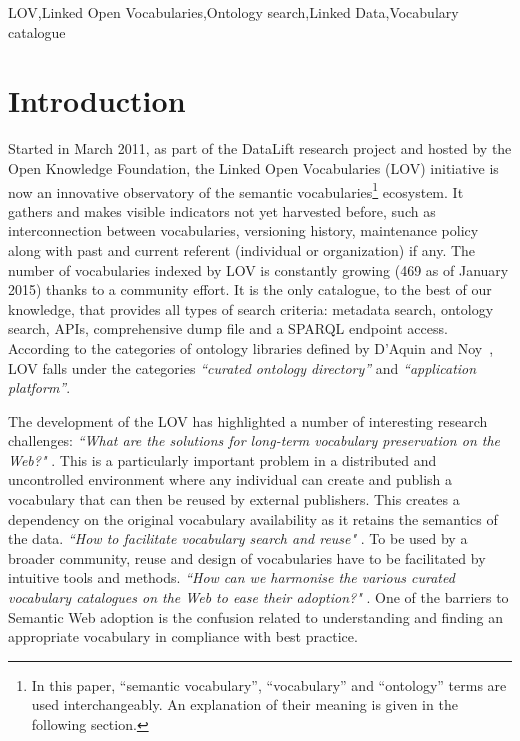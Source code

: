 \documentclass{iosart2c}
\begin{document}
\begin{frontmatter}
\begin{keyword}
LOV\sep Linked Open Vocabularies\sep Ontology search\sep Linked Data\sep Vocabulary catalogue
\end{keyword}

\end{frontmatter}


\section{Introduction}
Started in March 2011, as part of the DataLift research project \cite{scharffe_2012} and hosted by the Open Knowledge Foundation, the Linked Open Vocabularies (LOV) initiative is now an innovative observatory of the semantic vocabularies\footnote{In this paper, ``semantic vocabulary'', ``vocabulary'' and ``ontology'' terms are used interchangeably. An explanation of their meaning is given in the following section.} ecosystem. It gathers and makes visible indicators not yet harvested before, such as interconnection between vocabularies, versioning history, maintenance policy along with past and current referent (individual or organization) if any. The number of vocabularies indexed by LOV is constantly growing (469 as of January 2015) thanks to a community effort. It is the only catalogue, to the best of our knowledge, that provides all types of search criteria: metadata search, ontology search, APIs, comprehensive dump file and a SPARQL endpoint access. According to the categories of ontology libraries defined by D'Aquin and Noy~\cite{AquinJoWS12}, LOV falls under the categories \textit{``curated ontology directory''}  and \textit{``application platform''}. 

The development of the LOV has highlighted a number of interesting research challenges: \textit{``What are the solutions for long-term vocabulary preservation on the Web?"} \cite{Baker2013HLT}. This is a particularly important problem in a distributed and uncontrolled environment where any individual can create and publish a vocabulary that can then be reused by external publishers. This creates a dependency on the original vocabulary availability as it retains the semantics of the data. \textit{``How to facilitate vocabulary search and reuse"} \cite{butt2014, poveda2012landscape}. To be used by a broader community, reuse and design of vocabularies have to be facilitated by intuitive tools and methods.  \textit{``How can we harmonise the various curated vocabulary catalogues on the Web to ease their adoption?"} \cite{wasabi13}. One of the barriers to Semantic Web adoption is the confusion related to understanding and finding an appropriate vocabulary in compliance with best practice.
\end{document}
